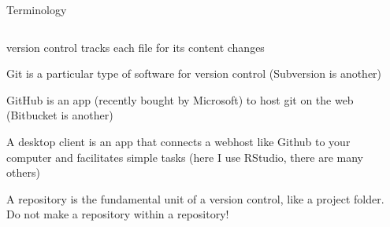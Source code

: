\documentclass[ignorenonframetext,notes, 10pt, aspectratio=169]{beamer}
\begin{document}
\begin{frame}{Terminology}
\begin{columns}[T]
\begin{column}{0.5\textwidth}
\begin{wideitemize}
\item version control \alert{tracks} each file for its content changes
\item \alert{Git} is a particular type of software for version control (Subversion is another)
\item \alert{GitHub} is an app (recently bought by Microsoft) to host git on the web (Bitbucket is another)
\item A \alert{desktop client} is an app that connects a webhost like Github to your computer and facilitates simple tasks (here I use \alert{RStudio}, there are many others)
\item A \alert{repository} is the fundamental unit of a version control, like a project folder. \pause Do not make a repository within a repository! 
\end{wideitemize}
\end{column}
\begin{column}{0.5\textwidth}
\end{column}
\end{columns}
\end{frame}
\end{document}
